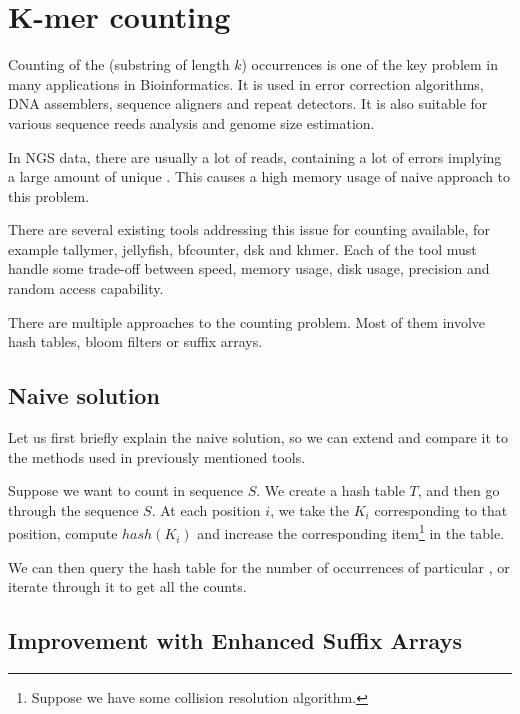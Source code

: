 \chapter{K-mer counting}


Counting of the \kmer(substring of length $k$) occurrences is one of the key problem in many applications in Bioinformatics.
It is used in error correction algorithms, DNA assemblers, sequence aligners and repeat detectors. It is also suitable for various sequence reeds analysis and genome size estimation.

In NGS data, there are usually a lot of reads, containing a lot of errors implying a large amount of unique \kmers.
This causes a high memory usage of naive approach to this problem.

There are several existing tools addressing this issue for \kmer counting available, for example tallymer\cite{tallymer}, jellyfish\cite{jellyfish}, bfcounter\cite{bfcounter}, dsk\cite{dsk} and khmer\cite{khmer}. Each of the tool must handle some trade-off between speed, memory usage, disk usage, precision and random access capability.

There are multiple approaches to the \kmer counting problem. Most of them involve hash tables, bloom filters or suffix arrays.

\section{Naive solution}

Let us first briefly explain the naive solution, so we can extend and compare it to the methods used in previously mentioned tools.

Suppose we want to count \kmers in sequence $S$.
We create a hash table $T$, and then go through the sequence $S$.
At each position $i$, we take the \kmer $K_i$ corresponding to that  position, compute $hash(K_i)$ and increase the corresponding item\footnote{Suppose we have some collision resolution algorithm.} in the table.

We can then query the hash table for the number of occurrences of particular \kmer, or iterate through it to get all the counts.

\section{Improvement with Enhanced Suffix Arrays}

